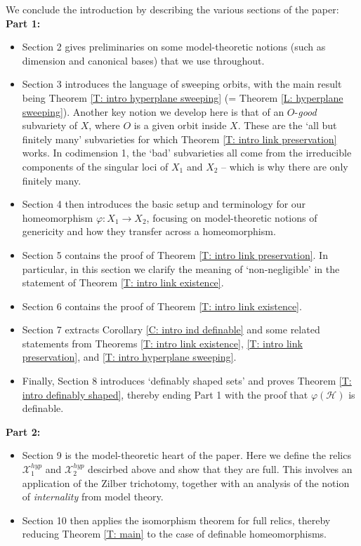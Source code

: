 \documentclass{amsart}
\theoremstyle{definition}
\begin{document}
We conclude the introduction by describing the various sections of the paper:\\

\textbf{Part 1:}

\begin{itemize}
    \item Section 2 gives preliminaries on some model-theoretic notions (such as dimension and canonical bases) that we use throughout.
    \item Section 3 introduces the language of sweeping orbits, with the main result being Theorem \ref{T: intro hyperplane sweeping} (= Theorem \ref{L: hyperplane sweeping}). Another key notion we develop here is that of an $O$-\textit{good} subvariety of $X$, where $O$ is a given orbit inside $X$. These are the `all but finitely many' subvarieties for which Theorem \ref{T: intro link preservation} works. In codimension 1, the `bad' subvarieties all come from the irreducible components of the singular loci of $X_1$ and $X_2$ -- which is why there are only finitely many.
    \item Section 4 then introduces the basic setup and terminology for our homeomorphism $\varphi:X_1\rightarrow X_2$, focusing on model-theoretic notions of genericity and how they transfer across a homeomorphism.
    \item Section 5 contains the proof of Theorem \ref{T: intro link preservation}. In particular, in this section we clarify the meaning of `non-negligible' in the statement of Theorem \ref{T: intro link existence}. 
    \item Section 6 contains the proof of Theorem \ref{T: intro link existence}.
    \item Section 7 extracts Corollary \ref{C: intro ind definable} and some related statements from Theorems \ref{T: intro link existence}, \ref{T: intro link preservation}, and \ref{T: intro hyperplane sweeping}.
    \item Finally, Section 8 introduces `definably shaped sets' and proves Theorem \ref{T: intro definably shaped}, thereby ending Part 1 with the proof that $\varphi(\mathcal H)$ is definable.
\end{itemize}

\textbf{Part 2:}
\begin{itemize}
    \item Section 9 is the model-theoretic heart of the paper. Here we define the relics $\mathcal X_1^{hyp}$ and $\mathcal X_2^{hyp}$ descirbed above and show that they are full. This involves an application of the Zilber trichotomy, together with an analysis of the notion of \textit{internality} from model theory.
    \item Section 10 then applies the isomorphism theorem for full relics, thereby reducing Theorem \ref{T: main} to the case of definable homeomorphisms.
\end{itemize}
\end{document}

